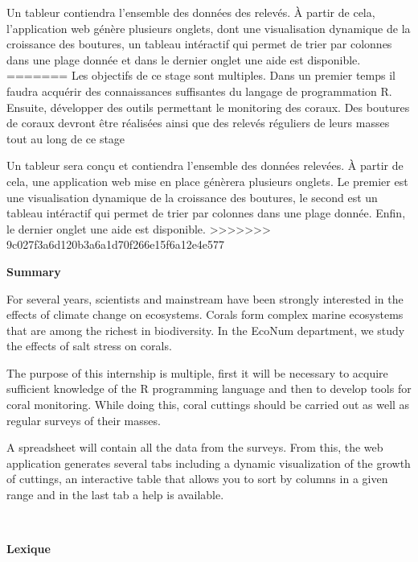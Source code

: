 \documentclass[]{report}
\begin{document}
Un tableur contiendra l'ensemble des données des relevés. À partir de
cela, l'application web génère plusieurs onglets, dont une visualisation
dynamique de la croissance des boutures, un tableau intéractif qui
permet de trier par colonnes dans une plage donnée et dans le dernier
onglet une aide est disponible.
=======
Les objectifs de ce stage sont multiples. Dans un premier temps il
faudra acquérir des connaissances suffisantes du langage de
programmation R. Ensuite, développer des outils permettant le monitoring
des coraux. Des boutures de coraux devront être réalisées ainsi que des
relevés réguliers de leurs masses tout au long de ce stage

Un tableur sera conçu et contiendra l'ensemble des données relevées. À
partir de cela, une application web mise en place génèrera plusieurs
onglets. Le premier est une visualisation dynamique de la croissance des
boutures, le second est un tableau intéractif qui permet de trier par
colonnes dans une plage donnée. Enfin, le dernier onglet une aide est
disponible.
>>>>>>> 9c027f3a6d120b3a6a1d70f266e15f6a12e4e577

\vspace{2 cm}

\Huge 
{\bf Summary} \vspace{1 cm}

\normalsize
For several years, scientists and mainstream have been strongly
interested in the effects of climate change on ecosystems. Corals form
complex marine ecosystems that are among the richest in biodiversity. In
the EcoNum department, we study the effects of salt stress on corals.

The purpose of this internship is multiple, first it will be necessary
to acquire sufficient knowledge of the R programming language and then
to develop tools for coral monitoring. While doing this, coral cuttings
should be carried out as well as regular surveys of their masses.

A spreadsheet will contain all the data from the surveys. From this, the
web application generates several tabs including a dynamic visualization
of the growth of cuttings, an interactive table that allows you to sort
by columns in a given range and in the last tab a help is available.

\null
\newpage

\tableofcontents

\null
\newpage

\textcolor{white}{.}

\Huge 
{\bf Lexique} \vspace{1 cm}
\end{document}
